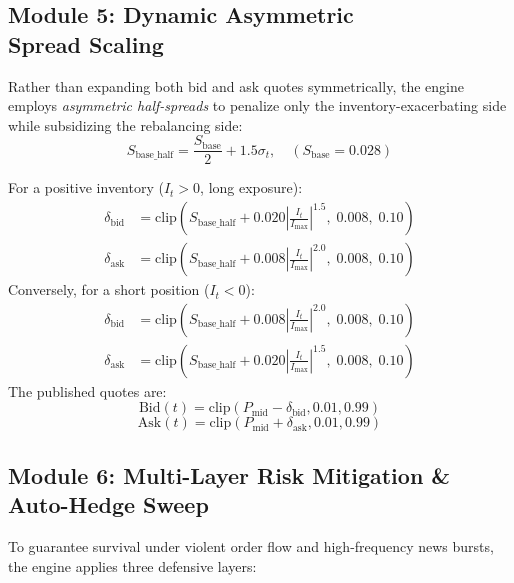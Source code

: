 \documentclass[10pt,twocolumn]{article}
\begin{document}
\subsection[Module 5: Dynamic Asymmetric Spread Scaling]{Module 5: Dynamic Asymmetric \\ Spread Scaling}

Rather than expanding both bid and ask quotes symmetrically, the engine employs \textit{asymmetric half-spreads} to penalize only the inventory-exacerbating side while subsidizing the rebalancing side:
\begin{equation}
S_{\text{base\_half}} = \frac{S_{\text{base}}}{2} + 1.5 \sigma_t, \quad (S_{\text{base}} = 0.028)
\end{equation}

For a positive inventory ($I_t > 0$, long exposure):
\begin{align}
\delta_{\text{bid}} &= \text{clip}\left(S_{\text{base\_half}} + 0.020 \left|\frac{I_t}{I_{\max}}\right|^{1.5}, \; 0.008, \; 0.10\right) \\
\delta_{\text{ask}} &= \text{clip}\left(S_{\text{base\_half}} + 0.008 \left|\frac{I_t}{I_{\max}}\right|^{2.0}, \; 0.008, \; 0.10\right)
\end{align}
Conversely, for a short position ($I_t < 0$):
\begin{align}
\delta_{\text{bid}} &= \text{clip}\left(S_{\text{base\_half}} + 0.008 \left|\frac{I_t}{I_{\max}}\right|^{2.0}, \; 0.008, \; 0.10\right) \\
\delta_{\text{ask}} &= \text{clip}\left(S_{\text{base\_half}} + 0.020 \left|\frac{I_t}{I_{\max}}\right|^{1.5}, \; 0.008, \; 0.10\right)
\end{align}
The published quotes are:
\begin{equation}
\text{Bid}(t) = \text{clip}(P_{\text{mid}} - \delta_{\text{bid}}, 0.01, 0.99)
\end{equation}
\begin{equation}
\text{Ask}(t) = \text{clip}(P_{\text{mid}} + \delta_{\text{ask}}, 0.01, 0.99)
\end{equation}

\subsection{Module 6: Multi-Layer Risk Mitigation \& Auto-Hedge Sweep}

To guarantee survival under violent order flow and high-frequency news bursts, the engine applies three defensive layers:
\end{document}
